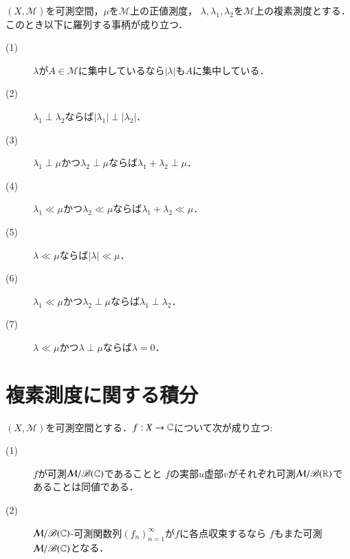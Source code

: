 	
	\begin{itembox}[l]{}
		\begin{prp}[絶対連続性と特異性に関する性質]
			$(X,\mathcal{M})$を可測空間，$\mu$を$\mathcal{M}$上の正値測度，
			$\lambda,\lambda_1,\lambda_2$を$\mathcal{M}$上の複素測度とする．このとき以下に羅列する事柄が成り立つ．
			\begin{description}
				\item[(1)] $\lambda$が$A \in \mathcal{M}$に集中しているなら$|\lambda|$も$A$に集中している．
				\item[(2)] $\lambda_1 \perp \lambda_2$ならば$|\lambda_1| \perp |\lambda_2|$．
				\item[(3)] $\lambda_1 \perp \mu$かつ$\lambda_2 \perp \mu$ならば$\lambda_1 + \lambda_2 \perp \mu$．
				\item[(4)] $\lambda_1 \ll \mu$かつ$\lambda_2 \ll \mu$ならば$\lambda_1 + \lambda_2 \ll \mu$．
				\item[(5)] $\lambda \ll \mu$ならば$|\lambda| \ll \mu$．
				\item[(6)] $\lambda_1 \ll \mu$かつ$\lambda_2 \perp \mu$ならば$\lambda_1 \perp \lambda_2$．
				\item[(7)] $\lambda \ll \mu$かつ$\lambda \perp \mu$ならば$\lambda = 0$．
			\end{description}
			\label{prp:absolute_continuous_singular}
		\end{prp}
	\end{itembox}
	
	\section{複素測度に関する積分}
	\begin{screen}
		\begin{thm}[複素数値関数の可測性]
			$(X,\mathcal{M})$を可測空間とする．$f:X \rightarrow \mathbb{C}$について次が成り立つ:
			\begin{description}
				\item[(1)] $f$が可測$\mathcal{M}/\mathscr{B}(\mathbb{C})$であることと
					$f$の実部$u$虚部$v$がそれぞれ可測$\mathcal{M}/\mathscr{B}(\mathbb{R})$であることは同値である．
					
				\item[(2)] $\mathcal{M}/\mathscr{B}(\mathbb{C})$-可測関数列$(f_n)_{n=1}^{\infty}$が$f$に各点収束するなら
					$f$もまた可測$\mathcal{M}/\mathscr{B}(\mathbb{C})$となる．
			\end{description}
			\label{thm:measurability_of_complex_measurable_functions}
		\end{thm}
	\end{screen}
	
